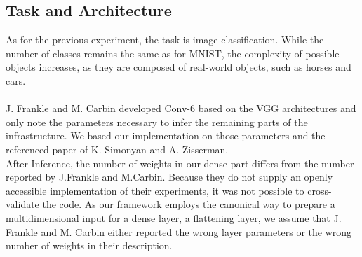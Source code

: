 \subsection*{Task and Architecture}
As for the previous experiment, the task is image classification. While the number of classes remains the same as for MNIST, the complexity of possible objects increases, as they are composed of real-world objects, such as horses and cars.\\
\\
J. Frankle and M. Carbin developed Conv-6 based on the VGG architectures and only note the parameters necessary to infer the remaining parts of the infrastructure.\cite{LTH} We based our implementation on those parameters and the referenced paper of K. Simonyan and A. Zisserman.\cite{VGG16}\\
After Inference, the number of weights in our dense part differs from the number reported by J.Frankle and M.Carbin. Because they do not supply an openly accessible implementation of their experiments, it was not possible to cross-validate the code.
As our framework employs the canonical way to prepare a multidimensional input for a dense layer, a flattening layer, we assume that J. Frankle and M. Carbin either reported the wrong layer parameters or the wrong number of weights in their description.
\newpage 
